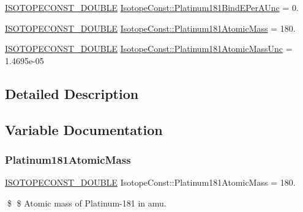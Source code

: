 \begin{DoxyCompactItemize}
\mbox{\hyperlink{group___isotope_const-_macros_ga8f45a7272ce02c0b4c65c44636ed719a}{I\+S\+O\+T\+O\+P\+E\+C\+O\+N\+S\+T\+\_\+\+D\+O\+U\+B\+LE}} \mbox{\hyperlink{group___isotope_const-_platinum-_pt181_ga73fd8ebf6a337ce0a6871525556bb45d}{Isotope\+Const\+::\+Platinum181\+Bind\+E\+Per\+A\+Unc}} = 0.
\item 
\mbox{\hyperlink{group___isotope_const-_macros_ga8f45a7272ce02c0b4c65c44636ed719a}{I\+S\+O\+T\+O\+P\+E\+C\+O\+N\+S\+T\+\_\+\+D\+O\+U\+B\+LE}} \mbox{\hyperlink{group___isotope_const-_platinum-_pt181_gae9a6e95bbca79e9de1363139c5e45af1}{Isotope\+Const\+::\+Platinum181\+Atomic\+Mass}} = 180.
\item 
\mbox{\hyperlink{group___isotope_const-_macros_ga8f45a7272ce02c0b4c65c44636ed719a}{I\+S\+O\+T\+O\+P\+E\+C\+O\+N\+S\+T\+\_\+\+D\+O\+U\+B\+LE}} \mbox{\hyperlink{group___isotope_const-_platinum-_pt181_gab674fc9f232ba1ba9255697140a90cc3}{Isotope\+Const\+::\+Platinum181\+Atomic\+Mass\+Unc}} = 1.\+4695e-\/05
\end{DoxyCompactItemize}


\subsection{Detailed Description}


\subsection{Variable Documentation}
\mbox{\label{group___isotope_const-_platinum-_pt181_gae9a6e95bbca79e9de1363139c5e45af1}} 
\subsubsection{\texorpdfstring{Platinum181\+Atomic\+Mass}{Platinum181AtomicMass}}
{\footnotesize\ttfamily \mbox{\hyperlink{group___isotope_const-_macros_ga8f45a7272ce02c0b4c65c44636ed719a}{I\+S\+O\+T\+O\+P\+E\+C\+O\+N\+S\+T\+\_\+\+D\+O\+U\+B\+LE}} Isotope\+Const\+::\+Platinum181\+Atomic\+Mass = 180.}

\$ \$ Atomic mass of Platinum-\/181 in amu. \mbox{\label{group___isotope_const-_platinum-_pt181_gab674fc9f232ba1ba9255697140a90cc3}} 
